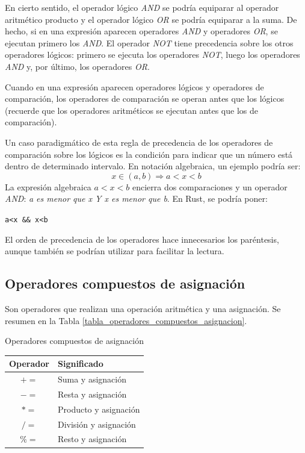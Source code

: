 En cierto sentido, el operador lógico \textit{AND} se podría equiparar al operador aritmético producto y el operador lógico \textit{OR} se podría equiparar a la suma. De hecho, si en una expresión aparecen operadores \textit{AND} y operadores \textit{OR}, se ejecutan primero los \textit{AND}. El operador \textit{NOT} tiene precedencia sobre los otros operadores lógicos: primero se ejecuta los operadores \textit{NOT}, luego los operadores \textit{AND} y, por último, los operadores \textit{OR}.
 
Cuando en una expresión aparecen operadores lógicos y operadores de comparación, los operadores de comparación se operan antes que los lógicos (recuerde que los operadores aritméticos se ejecutan antes que los de comparación). 

Un caso paradigmático de esta regla de precedencia de los operadores de comparación sobre los lógicos es la condición para indicar que un número está dentro de determinado intervalo. En notación algebraica, un ejemplo podría ser:
\[x \in (a, b) \Rightarrow a < x < b\]
La expresión algebraica $a<x<b$ encierra dos comparaciones y un operador \textit{AND}: \textit{a es menor que x Y x es menor que b}. En Rust, se podría poner:

{\centering \texttt{a<x \&\& x<b} \par}

El orden de precedencia de los operadores hace innecesarios los paréntesis, aunque también se podrían utilizar para facilitar la lectura.

\subsection{Operadores compuestos de asignación}
Son operadores que realizan una operación aritmética y una asignación. Se resumen en la Tabla \ref{tabla_operadores_compuestos_asignacion}.

\begin{center}
   \begin{mytable}[label=tabla_operadores_compuestos_asignacion]{\centering\footnotesize Operadores compuestos de asignación}
      \footnotesize
      \begin{tabular}{c l}
         \hline
         \textbf{Operador} & \textbf{Significado} \\ \hline
         $+=$ & Suma y asignación \\
         $-=$ & Resta y asignación \\
         $*=$ & Producto y asignación\\
         $/=$ & División y asignación\\
         $\%=$ & Resto y asignación\\
      \end{tabular}
   \end{mytable}
\end{center}

